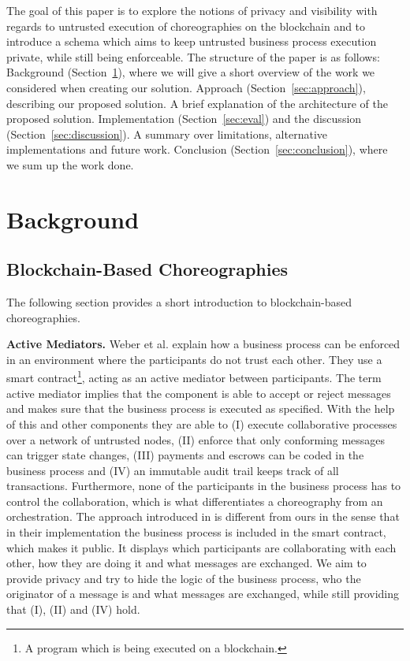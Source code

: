 \documentclass[runningheads]{llncs}
\newcommand{\refsec}[1]{Section~\ref{#1}}
\begin{document}
The goal of this paper is to explore the notions of privacy and visibility with regards to untrusted execution of choreographies on the blockchain and to introduce a schema which aims to keep untrusted business process execution private, while still being enforceable. The structure of the paper is as follows: Background (\refsec{sec:background}), where we will give a short overview of the work we considered when creating our solution. Approach (\refsec{sec:approach}), describing our proposed solution. A brief explanation of the architecture of the proposed solution. Implementation (\refsec{sec:eval}) and the discussion (\refsec{sec:discussion}). A summary over limitations, alternative implementations and future work. Conclusion (\refsec{sec:conclusion}), where we sum up the work done.


\section{Background} \label{sec:background}

\subsection{Blockchain-Based Choreographies} \label{subsec:blockchainbased}

The following section provides a short introduction to blockchain-based choreographies. 

\textbf{Active Mediators.} Weber et al. explain how a business process can be enforced in an environment where the participants do not trust each other. They use a smart contract\footnote{A program which is being executed on a blockchain.}, acting as an active mediator between participants. The term active mediator implies that the component is able to accept or reject messages and makes sure that the business process is executed as specified. With the help of this and other components they are able to (I) execute collaborative processes over a network of untrusted nodes, (II) enforce that only conforming messages can trigger state changes, (III) payments and escrows can be coded in the business process and (IV) an immutable audit trail keeps track of all transactions. Furthermore, none of the participants in the business process has to control the collaboration, which is what differentiates a choreography from an orchestration. The approach introduced in \cite{weber2016untrusted} is different from ours in the sense that in their implementation the business process is included in the smart contract, which makes it public. It displays which participants are collaborating with each other, how they are doing it and what messages are exchanged. We aim to provide privacy and try to hide the logic of the business process, who the originator of a message is  and what messages are exchanged, while still providing that (I), (II) and (IV) hold.
\end{document}
